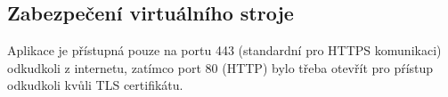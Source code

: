 \subsection{Zabezpečení virtuálního stroje}
Aplikace je přístupná pouze na portu 443 (standardní pro HTTPS komunikaci) odkudkoli z internetu, zatímco port 80 (HTTP) bylo třeba otevřít pro pŕístup odkudkoli kvůli TLS certifikátu.